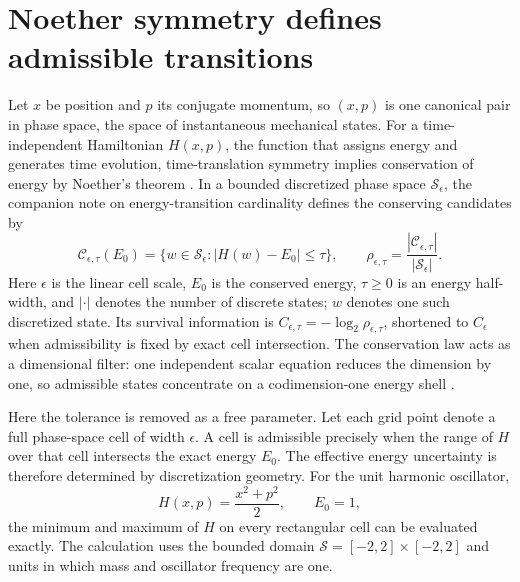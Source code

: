 \documentclass[10pt]{article}
\begin{document}
\section*{Noether symmetry defines admissible transitions}

Let $x$ be position and $p$ its conjugate momentum, so $(x,p)$ is one
canonical pair in phase space, the space of instantaneous mechanical states.
For a time-independent Hamiltonian $H(x,p)$, the function that assigns energy
and generates time evolution, time-translation symmetry implies conservation
of energy by Noether's theorem \citep{Noether1918,Arnold1989}.
In a bounded discretized phase space $\mathcal S_\epsilon$, the companion note
on energy-transition cardinality defines the conserving candidates by
\begin{equation}
\mathcal C_{\epsilon,\tau}(E_0)
=\{w\in\mathcal S_\epsilon:|H(w)-E_0|\le\tau\},
\qquad
\rho_{\epsilon,\tau}
=\frac{|\mathcal C_{\epsilon,\tau}|}{|\mathcal S_\epsilon|}.
\label{eq:noether-set}
\end{equation}
Here $\epsilon$ is the linear cell scale, $E_0$ is the conserved energy,
$\tau\geq0$ is an energy half-width, and $|\cdot|$ denotes the number of
discrete states; $w$ denotes one such discretized state.  Its survival
information is $C_{\epsilon,\tau}=-\log_2\rho_{\epsilon,\tau}$, shortened to
$C_\epsilon$ when admissibility is fixed by exact cell intersection.  The
conservation law acts as a dimensional filter: one
independent scalar equation reduces the dimension by one, so admissible states
concentrate on a codimension-one energy shell
\citep{LandersNoether2026}.

Here the tolerance is removed as a free parameter.  Let each grid point denote
a full phase-space cell of width $\epsilon$.  A cell is admissible precisely
when the range of $H$ over that cell intersects the exact energy $E_0$.  The
effective energy uncertainty is therefore determined by discretization
geometry.  For the unit harmonic oscillator,
\begin{equation}
H(x,p)=\frac{x^2+p^2}{2},
\qquad E_0=1,
\label{eq:harmonic-hamiltonian}
\end{equation}
the minimum and maximum of $H$ on every rectangular cell can be evaluated
exactly.  The calculation uses the bounded domain
$\mathcal S=[-2,2]\times[-2,2]$ and units in which mass and oscillator
frequency are one.
\end{document}
